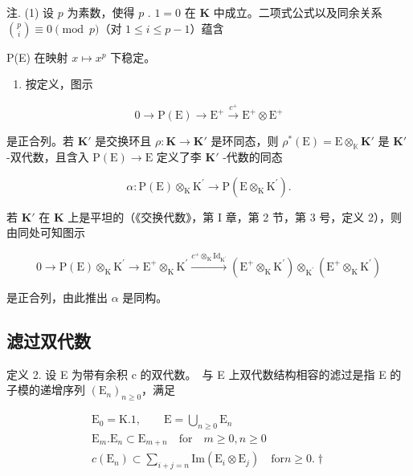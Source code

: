 注. (1) 设 \(p\) 为素数，使得 \(p\) . \(1 = 0\) 在 \(\mathbf{K}\) 中成立。二项式公式以及同余关系 \(\binom{p}{i} \equiv 0 \pmod{p}\)（对 \(1 \leqslant i \leqslant p - 1\)）蕴含

P(E) 在映射 \(x \mapsto x^p\) 下稳定。

\begin{enumerate}
\def\labelenumi{(\arabic{enumi})}
\setcounter{enumi}{1}
\tightlist
\item
  按定义，图示
\end{enumerate}

\[
0 \longrightarrow \mathrm{P(E)} \longrightarrow \mathrm {E^ {+}} \stackrel {c ^ {+}} {\longrightarrow} \mathrm {E^ {+}} \otimes \mathrm {E^ {+}}
\]

是正合列。若 \(\mathbf{K}'\) 是交换环且 \(\rho: \mathbf{K} \to \mathbf{K}'\) 是环同态，则 \(\rho^*(\mathrm{E}) = \mathrm{E} \otimes_{\mathbb{K}} \mathbf{K}'\) 是 \(\mathbf{K}'\) -双代数，且含入 \(\mathrm{P}(\mathrm{E}) \to \mathrm{E}\) 定义了李 \(\mathbf{K}'\) -代数的同态

\[
\alpha \colon \mathrm{P} (\mathrm{E}) \otimes_ {\mathrm{K}} \mathrm{K} ^ {\prime} \rightarrow \mathrm{P} (\mathrm{E} \otimes_ {\mathrm{K}} \mathrm{K} ^ {\prime}).
\]

若 \(\mathbf{K}'\) 在 \(\mathbf{K}\) 上是平坦的（《交换代数》，第 I 章，第 2 节，第 3 号，定义 2），则由同处可知图示

\[
0 \longrightarrow \mathrm{P} (\mathrm{E}) \otimes_ {\mathrm{K}} \mathrm{K} ^ {\prime} \longrightarrow \mathrm{E} ^ {+} \otimes_ {\mathrm{K}} \mathrm{K} ^ {\prime} \xrightarrow {c ^ {+} \otimes_ {\mathrm{K}} \mathrm{Id} _ {\mathrm{K} ^ {\prime}}} \left(\mathrm{E} ^ {+} \otimes_ {\mathrm{K}} \mathrm{K} ^ {\prime}\right) \otimes_ {\mathrm{K} ^ {\prime}} \left(\mathrm{E} ^ {+} \otimes_ {\mathrm{K}} \mathrm{K} ^ {\prime}\right)
\]

是正合列，由此推出 \(\alpha\) 是同构。

\subsection{滤过双代数}

定义 2. 设 E 为带有余积 c 的双代数。~与 E 上双代数结构相容的滤过是指 E 的子模的递增序列 \((\mathrm{E}_{n})_{n\geq0}\)，满足

\[
\begin{array}{c} \mathrm{E} _ {0} = \mathrm{K}. 1, \qquad \mathrm{E} = \bigcup_ {n \geqslant 0} \mathrm{E} _ {n} \\ \mathrm{E} _ {m}. \mathrm{E} _ {n} \subset \mathrm{E} _ {m + n} \quad \text {for} \quad m \geqslant 0, n \geqslant 0 \\ c (\mathrm{E} _ {n}) \subset \sum_ {i + j = n} \mathrm{Im} (\mathrm{E} _ {i} \otimes \mathrm{E} _ {j}) \quad \text {for} n \geqslant 0. \dagger \end{array}\tag{6}
\]

